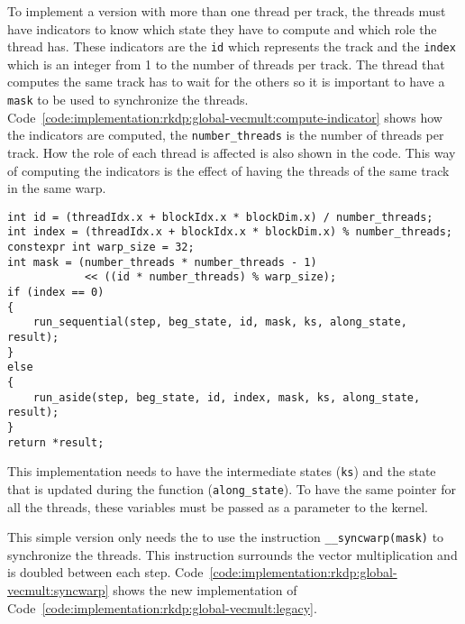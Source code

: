 To implement a version with more than one thread per track, the threads must
have indicators to know which state they have to compute and which role the
thread has. These indicators are the \texttt{id} which represents the track and
the \texttt{index} which is an integer from 1 to the number of threads per track.
The thread that computes the same track has to wait for the others so it is
important to have a \texttt{mask} to be used to synchronize the threads.
Code~\ref{code:implementation:rkdp:global-vecmult:compute-indicator} shows how
the indicators are computed, the \texttt{number\_threads} is the number of
threads per track.
How the role of each thread is affected is also shown in the code.
This way of computing the indicators is the effect of having the threads of the
same track in the same warp.

\begin{code}
    \label{code:implementation:rkdp:global-vecmult:compute-indicator}
    \begin{verbatim}
int id = (threadIdx.x + blockIdx.x * blockDim.x) / number_threads;
int index = (threadIdx.x + blockIdx.x * blockDim.x) % number_threads;
constexpr int warp_size = 32;
int mask = (number_threads * number_threads - 1)
            << ((id * number_threads) % warp_size);
if (index == 0)
{
    run_sequential(step, beg_state, id, mask, ks, along_state, result);
}
else
{
    run_aside(step, beg_state, id, index, mask, ks, along_state, result);
}
return *result;
    \end{verbatim}
\end{code}

This implementation needs to have the intermediate states (\texttt{ks}) and the
state that is updated during the function (\texttt{along\_state}).
To have the same pointer for all the threads, these variables must be passed
as a parameter to the kernel.

This simple version only needs the to use the instruction \texttt{\_\_syncwarp(mask)}
to synchronize the threads.
This instruction surrounds the vector multiplication and is doubled between each
step.
Code~\ref{code:implementation:rkdp:global-vecmult:syncwarp} shows the new
implementation of Code~\ref{code:implementation:rkdp:global-vecmult:legacy}.

